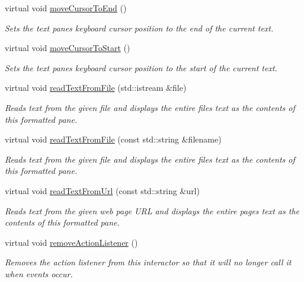 \begin{DoxyCompactItemize}
virtual void \mbox{\hyperlink{classGBrowserPane_ab5ef729cac166db0ef51ff7ea30d1bb8}{move\+Cursor\+To\+End}} ()
\begin{DoxyCompactList}\small\item\em Sets the text pane\textquotesingle{}s keyboard cursor position to the end of the current text. \end{DoxyCompactList}\item 
virtual void \mbox{\hyperlink{classGBrowserPane_a24abdceab57bcff96185afbadf193a22}{move\+Cursor\+To\+Start}} ()
\begin{DoxyCompactList}\small\item\em Sets the text pane\textquotesingle{}s keyboard cursor position to the start of the current text. \end{DoxyCompactList}\item 
virtual void \mbox{\hyperlink{classGBrowserPane_a5e6d9158a9311204ca49518c32072ce0}{read\+Text\+From\+File}} (std\+::istream \&file)
\begin{DoxyCompactList}\small\item\em Reads text from the given file and displays the entire file\textquotesingle{}s text as the contents of this formatted pane. \end{DoxyCompactList}\item 
virtual void \mbox{\hyperlink{classGBrowserPane_a58c4154aa0c23bc980d45bf9de7cc95c}{read\+Text\+From\+File}} (const std\+::string \&filename)
\begin{DoxyCompactList}\small\item\em Reads text from the given file and displays the entire file\textquotesingle{}s text as the contents of this formatted pane. \end{DoxyCompactList}\item 
virtual void \mbox{\hyperlink{classGBrowserPane_a68ff415e722130964bc9e1de826f4869}{read\+Text\+From\+Url}} (const std\+::string \&url)
\begin{DoxyCompactList}\small\item\em Reads text from the given web page U\+RL and displays the entire page\textquotesingle{}s text as the contents of this formatted pane. \end{DoxyCompactList}\item 
virtual void \mbox{\hyperlink{classGInteractor_ab7fe7a876367b87cf7202f947f1d05e4}{remove\+Action\+Listener}} ()
\begin{DoxyCompactList}\small\item\em Removes the action listener from this interactor so that it will no longer call it when events occur. \end{DoxyCompactList}\item 

\end{DoxyCompactItemize}
